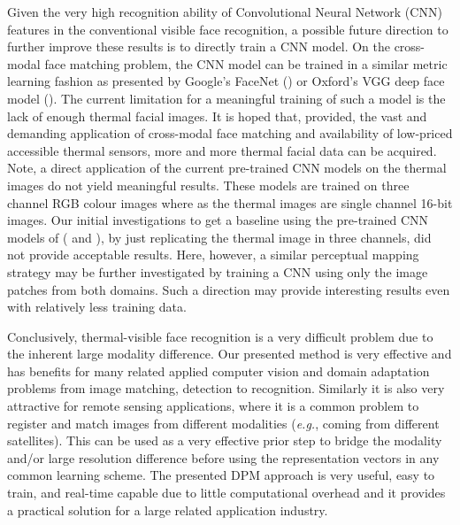 \documentclass[smallextended,natbib]{svjour3}       \usepackage{graphicx}
\newcommand{\eg}{\emph{e.g.}}
\begin{document}
Given the very high recognition ability of Convolutional Neural Network (CNN) features in the conventional visible face recognition, a possible future direction to further improve these results is to directly train a CNN model. On the cross-modal face matching problem,  the CNN model can be trained in a similar metric learning fashion as presented by Google's FaceNet (\cite{schroff2015facenet}) or Oxford's VGG deep face model (\cite{Parkhi15}). The current limitation for a meaningful training of such a model is the lack of enough thermal facial images. It is hoped that, provided, the vast and demanding application of cross-modal face matching and availability of low-priced accessible thermal sensors, more and more thermal facial data can be acquired. Note, a direct application of the current pre-trained CNN models on the thermal images do not yield meaningful results. These models are trained on three channel RGB colour images where as the thermal images are single channel 16-bit images. Our initial investigations to get a baseline using the pre-trained CNN models of (\cite{schroff2015facenet} and \cite{Parkhi15}), by just replicating the thermal image in three channels, did not provide acceptable results. Here, however, a similar perceptual mapping strategy may be further investigated by training a CNN using only the image patches from both domains. Such  a direction may provide interesting results even with relatively less training data.
   
Conclusively, thermal-visible face recognition is a very difficult problem due to the inherent large modality difference. Our presented method is very effective and has benefits for many related applied computer vision and domain adaptation problems from image matching, detection to recognition. Similarly it is also very attractive for remote sensing applications, where it is a common problem to register and match images from different modalities (\eg, coming from different satellites). This can be used as a very effective prior step to bridge the modality and/or large resolution difference before using the representation vectors in any common learning scheme. The presented DPM approach is very useful, easy to train, and real-time capable due to little computational overhead and it provides a practical solution for a large related application industry. 



      
  
\end{document}
